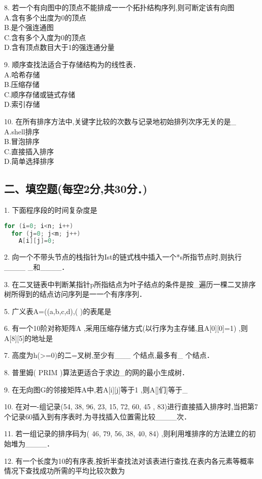 8. 若一个有向图中的顶点不能排成一一个拓扑结构序列,则可断定该有向图 \\
A.含有多个出度为0的顶点 \\
B.是个强连通图 \\
C.含有多个入度为0的顶点 \\
D.含有顶点数目大于1的强连通分量

9. 顺序查找法适合于存储结构为的线性表． \\
A.哈希存储 \\
B.压缩存储 \\
C.顺序存储或链式存储 \\
D.索引存储

10. 在所有排序方法中,关键字比较的次数与记录地初始排列次序无关的是_ \\
A.shell排序 \\
B.冒泡排序 \\
C.直接插入排序 \\
D.简单选择排序

\subsection{二、填空题(每空2分,共30分．)}

1. 下面程序段的时间复杂度是
\begin{lstlisting}[language=cpp]
for (i=0; i<n; i++)
  for (j=0; j<m; j++)
    A[i][j]=0;
\end{lstlisting}

2. 向一个不带头节点的栈指针为Ist的链式栈中插入一个*s所指节点时,则执行____ _和____．

3. 在二叉链表中判断某指针p所指结点为叶子结点的条件是按_遍历一棵二叉排序树所得到的结点访问序列是一一个有序序列．

5. 广义表A=((a,b,c,d),( )的表尾是

6. 有一个10阶对称矩阵A ,采用压缩存储方式(以行序为主存储,且A[0][0]=1) ,则A[8][5]的地址是

7. 高度为h(>=0)的二=叉树,至少有___ 个结点,最多有_ 个结点．

8. 普里姆( PRIM )算法更适合于求边_的网的最小生成树．

9. 在无向图G的邻接矩阵A中,若A[i][j]等于1 ,则A[]们]等于_

10. 在对一-组记录(54, 38, 96, 23, 15, 72, 60, 45 , 83)进行直接插入排序时,当把第7个记录60插入到有序表时,为寻找插入位置需比较____次．

11. 若一组记录的排序码为( 46, 79, 56, 38, 40, 84) ,则利用堆排序的方法建立的初始堆为____．

12. 有一个长度为10的有序表,按折半查找法对该表进行查找,在表内各元素等概率情况下查找成功所需的平均比较次数为
